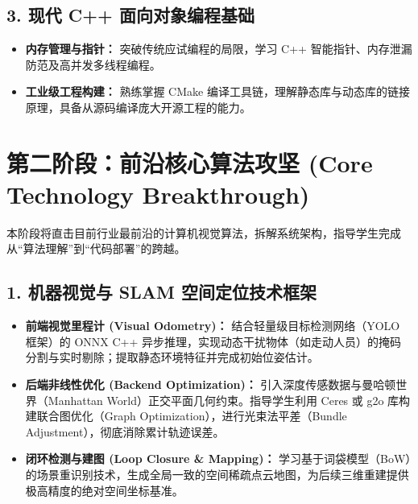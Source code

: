 \documentclass[11pt, a4paper]{ctexart}
\begin{document}
\subsection{3. 现代 C++ 面向对象编程基础}
\begin{itemize}[label=$\bullet$]
    \item \textbf{内存管理与指针：} 突破传统应试编程的局限，学习 C++ 智能指针、内存泄漏防范及高并发多线程编程。
    \item \textbf{工业级工程构建：} 熟练掌握 CMake 编译工具链，理解静态库与动态库的链接原理，具备从源码编译庞大开源工程的能力。
\end{itemize}

\section{第二阶段：前沿核心算法攻坚 (Core Technology Breakthrough)}

本阶段将直击目前行业最前沿的计算机视觉算法，拆解系统架构，指导学生完成从“算法理解”到“代码部署”的跨越。

\subsection{1. 机器视觉与 SLAM 空间定位技术框架}
\begin{itemize}[label=$\bullet$]
    \item \textbf{前端视觉里程计 (Visual Odometry)：} 结合轻量级目标检测网络（YOLO 框架）的 ONNX C++ 异步推理，实现动态干扰物体（如走动人员）的掩码分割与实时剔除；提取静态环境特征并完成初始位姿估计。
    \item \textbf{后端非线性优化 (Backend Optimization)：} 引入深度传感数据与曼哈顿世界（Manhattan World）正交平面几何约束。指导学生利用 Ceres 或 g2o 库构建联合图优化（Graph Optimization），进行光束法平差（Bundle Adjustment），彻底消除累计轨迹误差。
    \item \textbf{闭环检测与建图 (Loop Closure \& Mapping)：} 学习基于词袋模型（BoW）的场景重识别技术，生成全局一致的空间稀疏点云地图，为后续三维重建提供极高精度的绝对空间坐标基准。
\end{itemize}
\end{document}
